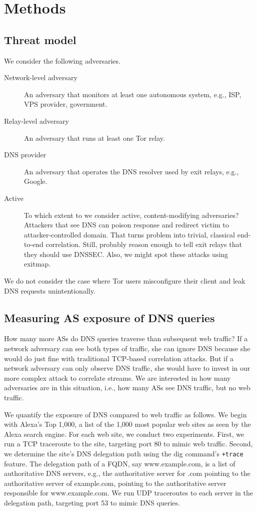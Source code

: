 \section{Methods}
\label{sec:methods}

\subsection{Threat model}
We consider the following adversaries.
\begin{description}
	\item[Network-level adversary] An adversary that monitors at least
		one autonomous system, e.g., ISP, VPS provider, government.
	\item[Relay-level adversary] An adversary that runs at least one Tor relay.
	\item[DNS provider] An adversary that operates the DNS resolver used
		by exit relays, e.g., Google.
	\item[Active] To which extent to we consider active, content-modifying
		adversaries?  Attackers that see DNS can poison response and redirect
		victim to attacker-controlled domain.  That turns problem into trivial,
		classical end-to-end correlation.  Still, probably reason enough to tell
		exit relays that they should use DNSSEC.  Also, we might spot these
		attacks using exitmap.
\end{description}

We do not consider the case where Tor users misconfigure their client and leak
DNS requests unintentionally.

\subsection{Measuring AS exposure of DNS queries}
\label{sec:as-exposure}
How many more ASs do DNS queries traverse than subsequent web traffic?  If a
network adversary can see both types of traffic, she can ignore DNS because she
would do just fine with traditional TCP-based correlation attacks.  But if a
network adversary can only observe DNS traffic, she would have to invest in our
more complex attack to correlate streams.  We are interested in how many
adversaries are in this situation, i.e., how many ASs see DNS traffic, but no
web traffic.

We quantify the exposure of DNS compared to web traffic as follows.  We begin
with Alexa's Top 1,000, a list of the 1,000 most popular web sites as seen by
the Alexa search engine.  For each web site, we conduct two experiments.  First,
we run a TCP traceroute to the site, targeting port 80 to mimic web traffic.
Second, we determine the site's DNS delegation path using the dig command's
\texttt{+trace} feature.  The delegation path of a FQDN, say www.example.com, is
a list of authoritative DNS servers, e.g., the authoritative server for .com
pointing to the authoritative server of example.com, pointing to the
authoritative server responsible for www.example.com.  We run UDP traceroutes to
each server in the delegation path, targeting port 53 to mimic DNS queries.

